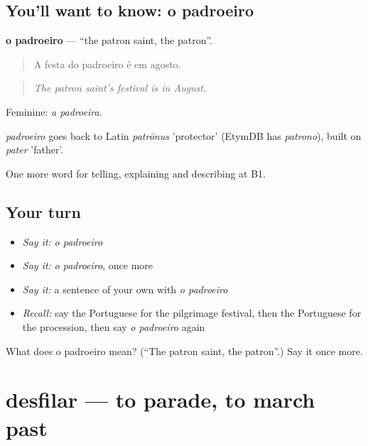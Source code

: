 \subsection*{You'll want to know: o padroeiro}
\textbf{o padroeiro} — \textquotedblleft{}the patron saint, the patron\textquotedblright{}.

\begin{quote}
A festa do padroeiro é em agosto.
\end{quote}

\begin{quote}
\emph{The patron saint's festival is in August.}
\end{quote}

Feminine: \emph{a padroeira}.

\begin{cousinweb}
\emph{padroeiro} goes back to Latin \emph{patrōnus} 'protector' (EtymDB has \emph{patrono}), built on \emph{pater} 'father'.
\end{cousinweb}

\begin{grammarlens}[title={What you've built}]
One more word for telling, explaining and describing at B1.
\end{grammarlens}

\subsection*{Your turn}
\begin{itemize}
\raggedright
  \item \emph{Say it:} \emph{o padroeiro}
  \item \emph{Say it:} \emph{o padroeiro}, once more
  \item \emph{Say it:} a sentence of your own with \emph{o padroeiro}
  \item \emph{Recall:} say the Portuguese for the pilgrimage festival, then the Portuguese for the procession, then say \emph{o padroeiro} again
\end{itemize}

\begin{tcolorbox}[breakable,colback=teal!4,colframe=teal!35!black,title={Before you move on}]
What does o padroeiro mean? (\textquotedblleft{}The patron saint, the patron\textquotedblright{}.) Say it once more.
\end{tcolorbox}
\section[desfilar]{desfilar — to parade, to march past}


